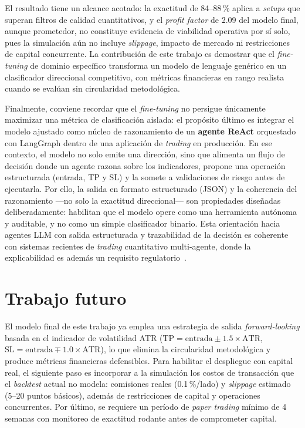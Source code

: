 \documentclass[10pt,twocolumn]{article}
\begin{document}
El resultado tiene un alcance acotado: la exactitud de 84--88\,\% aplica a \textit{setups} que superan filtros de calidad cuantitativos, y el \textit{profit factor} de 2.09 del modelo final, aunque prometedor, no constituye evidencia de viabilidad operativa por s\'i solo, pues la simulaci\'on a\'un no incluye \textit{slippage}, impacto de mercado ni restricciones de capital concurrente. La contribuci\'on de este trabajo es demostrar que el \textit{fine-tuning} de dominio espec\'ifico transforma un modelo de lenguaje gen\'erico en un clasificador direccional competitivo, con m\'etricas financieras en rango realista cuando se eval\'uan sin circularidad metodol\'ogica.

Finalmente, conviene recordar que el \textit{fine-tuning} no persigue \'unicamente maximizar una m\'etrica de clasificaci\'on aislada: el prop\'osito \'ultimo es integrar el modelo ajustado como n\'ucleo de razonamiento de un \textbf{agente ReAct} orquestado con LangGraph dentro de una aplicaci\'on de \textit{trading} en producci\'on. En ese contexto, el modelo no solo emite una direcci\'on, sino que alimenta un flujo de decisi\'on donde un agente razona sobre los indicadores, propone una operaci\'on estructurada (entrada, TP y SL) y la somete a validaciones de riesgo antes de ejecutarla. Por ello, la salida en formato estructurado (JSON) y la coherencia del razonamiento ---no solo la exactitud direccional--- son propiedades dise\~nadas deliberadamente: habilitan que el modelo opere como una herramienta aut\'onoma y auditable, y no como un simple clasificador binario. Esta orientaci\'on hacia agentes LLM con salida estructurada y trazabilidad de la decisi\'on es coherente con sistemas recientes de \textit{trading} cuantitativo multi-agente, donde la explicabilidad es adem\'as un requisito regulatorio~\cite{cheng2026}.

\section{Trabajo futuro}

El modelo final de este trabajo ya emplea una estrategia de salida \textit{forward-looking} basada en el indicador de volatilidad ATR ($\text{TP} = \text{entrada} \pm 1.5 \times \text{ATR}$, $\text{SL} = \text{entrada} \mp 1.0 \times \text{ATR}$), lo que elimina la circularidad metodol\'ogica y produce m\'etricas financieras defensibles. Para habilitar el despliegue con capital real, el siguiente paso es incorporar a la simulaci\'on los costos de transacci\'on que el \textit{backtest} actual no modela: comisiones reales (0.1\,\%/lado) y \textit{slippage} estimado (5--20 puntos b\'asicos), adem\'as de restricciones de capital y operaciones concurrentes. Por \'ultimo, se requiere un per\'iodo de \textit{paper trading} m\'inimo de 4 semanas con monitoreo de exactitud rodante antes de comprometer capital.
\end{document}
